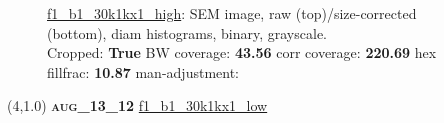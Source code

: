 \begin{figure}[h!]
\label{semimg4}
\caption*{\hyperlink{covtableaug_13_12}{\color{blue} \small \ttfamily f1\_b1\_30k1kx1\_high}: SEM image, raw (top)/size-corrected (bottom), diam histograms, binary, grayscale.\\Cropped: {\bf True} \;\; BW coverage: {\bf 43.56} \:\: corr coverage: {\bf 220.69} \:\: hex fillfrac: {\bf 10.87} \:\: man-adjustment: {\bf \color{blue}{Yes}}}
\end{figure}
\newpage

\begin{textblock}{5}(4,1.0)
{\bf \textsc{aug\_13\_12}}
\hspace{4.5cm}
\hyperlink{covtableaug_13_12}{\color{blue} \large \ttfamily f1\_b1\_30k1kx1\_low}
\end{textblock}

